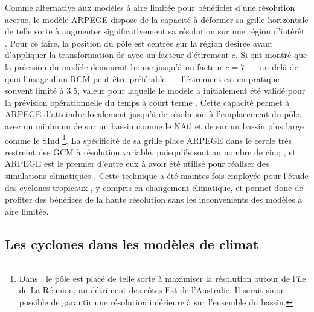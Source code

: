 \documentclass[../main.tex]{subfiles}
\begin{document}
Comme alternative aux modèles à aire limitée pour bénéficier d'une résolution accrue, le modèle ARPEGE dispose de la capacité à déformer sa grille horizontale
de telle sorte à augmenter significativement sa résolution sur une région d'intérêt \parencite{courtier_global_1988}. Pour ce faire, la position du pôle est
centrée sur la région désirée avant d'appliquer la transformation de \cite{schmidt_variable_1977} avec un facteur d'étirement $c$. Si \cite{caian_limits_1997}
ont montré que la précision du modèle demeurait bonne jusqu'à un facteur $c=7$ ---~au delà de quoi l'usage d'un RCM peut être préférable~--- l'étirement est en
pratique souvent limité à \num{3.5}, valeur pour laquelle le modèle a initialement été validé pour la prévision opérationnelle du temps à court terme
\parencite{benichou_validation_1992}. Cette capacité permet à ARPEGE d'atteindre localement jusqu'à  de résolution à l'emplacement du pôle, avec un
minimum de  sur un bassin comme le NAtl \parencite[][c.f \cref{fig:rotated_streched}]{chauvin_future_2020} et de  sur un bassin plus large comme
le SInd \parencite{cattiaux_projected_2020}\footnote{Dans \cite{cattiaux_projected_2020}, le pôle est placé de telle sorte à maximiser la résolution autour de l'île
de La Réunion, au détriment des côtes Est de l'Australie. Il serait sinon possible de garantir une résolution inférieure à  sur l'ensemble du bassin.}.
La spécificité de sa grille place ARPEGE dans le cercle très restreint des GCM à résolution variable, puisqu'ils sont au nombre de cinq
\parencite{mcgregor_recent_2013}, et ARPEGE est le premier d'entre eux à avoir été utilisé pour réaliser des simulations climatiques
\parencite{deque_high_1995}. Cette technique a été maintes fois employée pour l'étude des cyclones tropicaux
\parencite{chauvin_response_2006,chauvin_atlantic_2017,chauvin_future_2020,daloz_impact_2012,cattiaux_projected_2020}, y compris en changement climatique, et
permet donc de profiter des bénéfices de la haute résolution sans les inconvénients des modèles à aire limitée.

\subsection{Les cyclones dans les modèles de climat}
\end{document}
